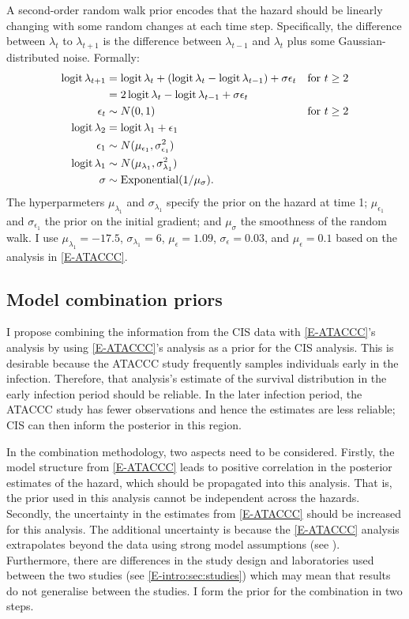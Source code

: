 \documentclass[thesis.tex]{subfiles}
\begin{document}
A second-order random walk prior encodes that the hazard should be linearly changing with some random changes at each time step.
Specifically, the difference between $\lambda_t$ to $\lambda_{t+1}$ is the difference between $\lambda_{t-1}$ and $\lambda_t$ plus some Gaussian-distributed noise.
Formally:
\begin{align}
  \operatorname{logit}\lambda_{t+1}
  &= \operatorname{logit}\lambda_t + (\operatorname{logit}\lambda_t - \operatorname{logit}\lambda_{t-1}) + \sigma \epsilon_t &\text{for $t \geq 2$} \\
  &= 2\operatorname{logit}\lambda_t - \operatorname{logit}\lambda_{t-1} + \sigma \epsilon_t \\
  \epsilon_t &\sim N(0, 1) &\text{for $t \geq 2$}  \\
  \operatorname{logit}\lambda_2 &= \operatorname{logit}\lambda_1 + \epsilon_1 \\\
  \epsilon_1 &\sim N(\mu_{\epsilon_1}, \sigma_{\epsilon_1}^2) \\
  \operatorname{logit} \lambda_1 &\sim N(\mu_{\lambda_1}, \sigma_{\lambda_1}^2) \\
  \sigma &\sim \operatorname{Exponential}(1/\mu_\sigma).
\end{align}
The hyperparmeters $\mu_{\lambda_1}$ and $\sigma_{\lambda_1}$ specify the prior on the hazard at time 1; $\mu_{\epsilon_1}$ and $\sigma_{\epsilon_1}$ the prior on the initial gradient; and $\mu_\sigma$ the smoothness of the random walk.
I use $\mu_{\lambda_1} = -17.5$, $\sigma_{\lambda_1} = 6$, $\mu_\epsilon = 1.09$, $\sigma_\epsilon = 0.03$, and $\mu_\epsilon = 0.1$ based on the analysis in \cref{E-ATACCC}.

\subsection{Model combination priors} \label{perf-test:sec:informative-priors}

I propose combining the information from the CIS data with \cref{E-ATACCC}'s analysis by using \cref{E-ATACCC}'s analysis as a prior for the CIS analysis.
This is desirable because the ATACCC study frequently samples individuals early in the infection.
Therefore, that analysis's estimate of the survival distribution in the early infection period should be reliable.
In the later infection period, the ATACCC study has fewer observations and hence the estimates are less reliable; CIS can then inform the posterior in this region.

In the combination methodology, two aspects need to be considered.
Firstly, the model structure from \cref{E-ATACCC} leads to positive correlation in the posterior estimates of the hazard, which should be propagated into this analysis.
That is, the prior used in this analysis cannot be independent across the hazards.
Secondly, the uncertainty in the estimates from \cref{E-ATACCC} should be increased for this analysis.
The additional uncertainty is because the \cref{E-ATACCC} analysis extrapolates beyond the data using strong model assumptions (see ).
Furthermore, there are differences in the study design and laboratories used between the two studies (see \cref{E-intro:sec:studies}) which may mean that results do not generalise between the studies.
I form the prior for the combination in two steps.
\end{document}
